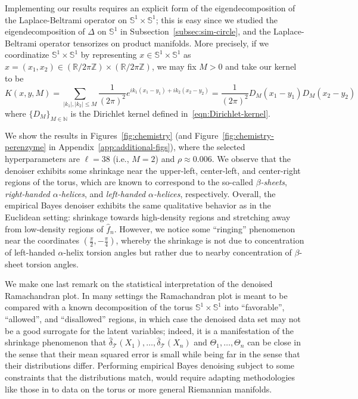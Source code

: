 \documentclass[preprint]{imsart}
\theoremstyle{plain}
\theoremstyle{definition}
\newcommand{\Rbb}{\mathbb{R}}
\newcommand{\Zbb}{\mathbb{Z}}
\newcommand{\Nbb}{\mathbb{N}}
\newcommand{\T}{\mathcal{T}}
\begin{document}
Implementing our results requires an explicit form of the eigendecomposition of the Laplace-Beltrami operator on $\mathbb{S}^1\times \mathbb{S}^1$; this is easy since we studied the eigendecomposition of $\Delta$ on $\mathbb{S}^1$ in Subsection~\ref{subsec:sim-circle}, and the Laplace-Beltrami operator tensorizes on product manifolds.
More precisely, if we coordinatize $\mathbb{S}^1\times \mathbb{S}^1$ by representing $x\in\mathbb{S}^1\times \mathbb{S}^1$ as $x=(x_1,x_2)\in(\Rbb/2\pi\Zbb)\times (\Rbb/2\pi\Zbb)$, we may fix $M>0$ and take our kernel to be
\begin{equation*}
    K(x,y,M) = \sum_{|k_1|,|k_2|\le M}\frac{1}{(2\pi)^2}e^{ik_1(x_1-y_1) + ik_2(x_2-y_2)} = \frac{1}{(2\pi)^2}D_M(x_1-y_1)D_M(x_2-y_2)
\end{equation*}
where $\{D_M\}_{M\in\Nbb}$ is the Dirichlet kernel defined in~\eqref{eqn:Dirichlet-kernel}.

We show the results in Figures~\ref{fig:chemistry} (and Figure~\ref{fig:chemistry-perenzyme} in Appendix~\ref{app:additional-figs}), where the selected hyperparameters are {$\ell=38$ (i.e., $M=2$)} and $\rho \approx 0.006$.
We observe that the denoiser exhibits some shrinkage near the upper-left, center-left, and center-right regions of the torus, which are known to correspond to the so-called \textit{$\beta$-sheets}, \textit{right-handed $\alpha$-helices}, and \textit{left-handed $\alpha$-helices}, respectively.
Overall, the empirical Bayes denoiser exhibits the same qualitative behavior as in the Euclidean setting: shrinkage towards high-density regions and stretching away from low-density regions of $\hat{f}_n$.
However, we notice some ``ringing'' phenomenon near the coordinates $(\frac{\pi}{2},-\frac{\pi}{4})$, whereby the shrinkage is not due to concentration of left-handed $\alpha$-helix torsion angles but rather due to nearby concentration of $\beta$-sheet torsion angles.

We make one last remark on the statistical interpretation of the denoised Ramachandran plot.
In many settings the Ramachandran plot is meant to be compared with a known decomposition of the torus $\mathbb{S}^1\times \mathbb{S}^1$ into ``favorable'', ``allowed'', and ``disallowed'' regions, in which case the denoised data set may not be a good surrogate for the latent variables; indeed, it is a manifestation of the shrinkage phenomenon that $\hat{\delta}_{\T}(X_1),\ldots, \hat{\delta}_{\T}(X_n)$ and $\Theta_1,\ldots,\Theta_n$ can be close in the sense that their mean squared error is small while being far in the sense that their distributions differ.
Performing empirical Bayes denoising subject to some constraints that the distributions match, would require adapting methodologies like those in \cite{ConstrainedEB} to data on the torus or more general Riemannian manifolds.
\end{document}
